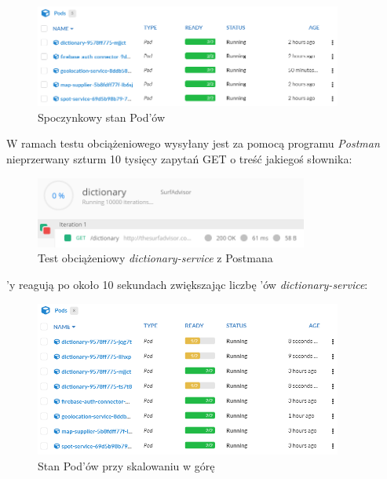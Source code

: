 \begin{figure}[!ht]
	\begin{center}
		\includegraphics[width=0.9\textwidth]{img/autoscaling/hpa-pods-normal}
	\end{center}
    \caption{Spoczynkowy stan Pod'ów}
\end{figure}

W ramach testu obciążeniowego wysyłany jest za pomocą programu \emph{Postman} nieprzerwany szturm 10 tysięcy zapytań GET o treść jakiegoś słownika:

\begin{figure}[!ht]
	\begin{center}
		\includegraphics[width=0.8\textwidth]{img/autoscaling/hpa-dictionary-test-postman}
	\end{center}
    \caption{Test obciążeniowy \emph{dictionary-service} z Postmana}
\end{figure}

'y reagują po około 10 sekundach zwiększając liczbę 'ów \emph{dictionary-service}:

\begin{figure}[!ht]
	\begin{center}
		\includegraphics[width=0.9\textwidth]{img/autoscaling/hpa-pods-scale-up}
	\end{center}
    \caption{Stan Pod'ów przy skalowaniu w górę}
\end{figure}

